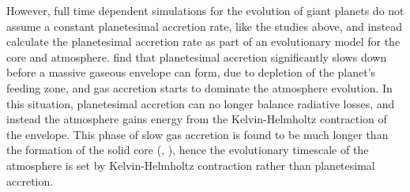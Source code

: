 \documentclass[apj]{emulateapj}
\begin{document}



However, full time dependent simulations for the evolution of giant planets do not assume a constant planetesimal accretion rate, like the studies above, and instead calculate the planetesimal accretion rate as part of an evolutionary model for the core and atmosphere. \citet{pollack96} find that planetesimal accretion significantly slows down before a massive gaseous envelope can form, due to depletion of the planet's feeding zone, and gas accretion starts to dominate the atmosphere evolution. In this situation, planetesimal accretion can no longer balance radiative losses, and instead the atmosphere gains energy from the Kelvin-Helmholtz contraction of the envelope. This phase of slow gas accretion is found to be much longer than the formation of the solid core (\citealt{pollack96}, \citealt{alibert05}), hence the evolutionary timescale of the atmosphere is set by Kelvin-Helmholtz contraction rather than planetesimal accretion.
\end{document}
